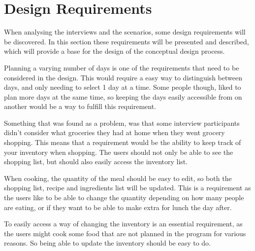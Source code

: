 \section{Design Requirements}

When analysing the interviews and the scenarios, some design requirements will be discovered. In this section these requirements will be presented and described, which will provide a base for the design of the conceptual design process.

Planning a varying number of days is one of the requirements that need to be considered in the design. This would require a easy way to distinguish between days, and only needing to select 1 day at a time.
Some people though, liked to plan more days at the same time, so keeping the days easily accessible from on another would be a way to fulfill this requirement.

Something that was found as a problem, was that some interview participants didn't consider what groceries they had at home when they went grocery shopping. This means that a requirement would be the ability to keep track of your inventory when shopping. The users should not only be able to see the shopping list, but should also easily access the inventory list.

When cooking, the quantity of the meal should be easy to edit, so both the shopping list, recipe and ingredients list will be updated. This is a requirement as the users like to be able to change the quantity depending on how many people are eating, or if they want to be able to make extra for lunch the day after.

To easily access a way of changing the inventory is an essential requirement, as the users might cook some food that are not planned in the program for various reasons. So being able to update the inventory should be easy to do.

